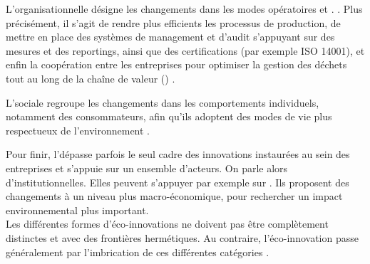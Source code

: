        L'\ei organisationnelle désigne les changements dans les modes opératoires et . \parencite{rennings2000redefining}. Plus précisément, il s'agit de rendre plus efficients les processus de production, de mettre en place des systèmes de management et d'audit s'appuyant sur des mesures et des reportings, ainsi que des certifications (par exemple ISO 14001), et enfin la coopération entre les entreprises pour optimiser la gestion des déchets tout au long de la chaîne de valeur () \parencite[][p.10]{kemp2007final}.

        L'\ei sociale regroupe les changements dans les comportements individuels, notamment des consommateurs, afin qu'ils adoptent des modes de vie plus respectueux de l'environnement \parencite{rennings2000redefining}.

        Pour finir, l'\ei dépasse parfois le seul cadre des innovations instaurées au sein des entreprises et s'appuie sur un ensemble d'acteurs. On parle alors d'\ei institutionnelles. Elles peuvent s'appuyer par exemple sur  \parencite[][p.324]{rennings2000redefining}. Ils proposent des changements à un niveau plus macro-économique, pour rechercher un impact environnemental plus important. \\

        Les différentes formes d'éco-innovations ne doivent pas être complètement distinctes et avec des frontières hermétiques. Au contraire, l'éco-innovation passe généralement par l'imbrication de ces différentes catégories \parencite{rennings2000redefining}.


